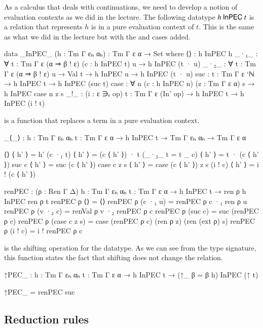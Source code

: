 \documentclass[a4paper,11pt]{article}
\newcommand\fun[1]{{\AgdaFunction{#1}}}
\newcommand\data[1]{{\AgdaFunction{#1}}}
\newcommand\con[1]{{\AgdaInductiveConstructor{#1}}}
\begin{document}
As a calculus that deals with continuations, we need to develop a notion of evaluation contexts as we did in the lecture.
The following datatype $h\ \data{InPEC}\ t$ is a relation that represents $h$ is in a pure evaluation context of $t$.
This is the same as what we did in the lecture but with the \con{case} and \con{suc} cases added.
\begin{code}
  data _InPEC_ (h : Tm Γ εₕ αₕ) : Tm Γ ε α → Set where
    ⟨⟩ : h InPEC h
    _·₁_ : ∀ {t : Tm Γ ε (α ⇒ β ! ε)} (c : h InPEC t) u → h InPEC (t · u)
    _·₂_ : ∀ {t : Tm Γ ε (α ⇒ β ! ε)} {u} → Val t → h InPEC u → h InPEC (t · u)
    suc : {t : Tm Γ ε `ℕ} → h InPEC t → h InPEC (suc t)
    case : ∀ {n} (c : h InPEC n) (z : Tm Γ ε α) s → h InPEC case n z s
    _!_ : (i : ε ∋ₑ op) {t : Tm Γ ε (In' op)} → h InPEC t → h InPEC (i ! t)
\end{code}
\fun{\_⟨\_⟩} is a function that replaces a term in a pure evaluation context.
\begin{code}
  _⟨_⟩ : {h : Tm Γ εₕ αₕ} {t : Tm Γ ε α} → h InPEC t → Tm Γ εₕ αₕ → Tm Γ ε α
\end{code}
\begin{code}[hide]
  ⟨⟩ ⟨ h' ⟩ = h'
  (c ·₁ t) ⟨ h' ⟩ = (c ⟨ h' ⟩) · t
  (_·₂_ {t = t} _ c) ⟨ h' ⟩ = t · (c ⟨ h' ⟩)
  suc c ⟨ h' ⟩ = suc (c ⟨ h' ⟩)
  case c z s ⟨ h' ⟩ = case (c ⟨ h' ⟩) z s
  (i ! c) ⟨ h' ⟩ = i ! (c ⟨ h' ⟩)

  renPEC : (ρ : Ren Γ Δ) {h : Tm Γ εₕ αₕ} {t : Tm Γ ε α}
    → h InPEC t
    → ren ρ h InPEC ren ρ t
  renPEC ρ ⟨⟩ = ⟨⟩
  renPEC ρ (c ·₁ u) = renPEC ρ c ·₁ ren ρ u
  renPEC ρ (v ·₂ c) = renVal ρ v ·₂ renPEC ρ c
  renPEC ρ (suc c) = suc (renPEC ρ c)
  renPEC ρ (case c z s) = case (renPEC ρ c) (ren ρ z) (ren (ext ρ) s)
  renPEC ρ (i ! c) = i ! renPEC ρ c
\end{code}
\fun{↑PEC\_} is the shifting operation for the \data{\_InPEC\_} datatype. As we can see from the type signature, this function states the fact that shifting does not change the \data{\_InPEC\_} relation.
\begin{code}
  ↑PEC_ : {h : Tm Γ εₕ αₕ} {t : Tm Γ ε α} → h InPEC t → (↑_ {β = β} h) InPEC (↑ t)
\end{code}
\begin{code}[hide]
  ↑PEC_ = renPEC suc
\end{code}

\subsection{Reduction rules}
\end{document}
